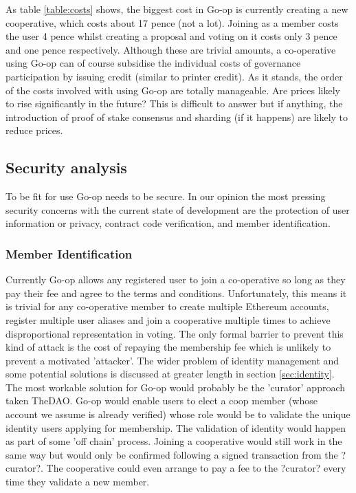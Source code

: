 As table \ref{table:costs} shows, the biggest cost in Go-op is currently creating a new cooperative, which costs about 17 pence (not a lot). Joining as a member costs the user 4 pence whilst creating a proposal and voting on it costs only 3 pence and one pence respectively. Although these are trivial amounts, a co-operative using Go-op can of course subsidise the individual costs of governance participation by issuing credit (similar to printer credit). As it stands, the order of the costs involved with using Go-op are totally manageable. Are prices likely to rise significantly in the future? This is difficult to answer but if anything, the introduction of proof of stake consensus and sharding (if it happens) are likely to reduce prices.\\

\subsection{Security analysis}
To be fit for use Go-op needs to be secure. In our opinion the most pressing security concerns with the current state of development are the protection of user information or privacy, contract code verification, and member identification.\\

\subsubsection{Member Identification}
Currently Go-op allows any registered user to join a co-operative so long as they pay their fee and agree to the terms and conditions. Unfortunately, this means it is trivial for any co-operative member to create multiple Ethereum accounts, register multiple user aliases and join a cooperative multiple times to achieve disproportional representation in voting. The only formal barrier to prevent this kind of attack is the cost of repaying the membership fee which is unlikely to prevent a motivated 'attacker'. The wider problem of identity management and some potential solutions is discussed at greater length in section \ref{sec:identity}. The most workable solution for Go-op would probably be the 'curator' approach taken TheDAO. Go-op would enable users to elect a coop member (whose account we assume is already verified) whose role would be to validate the unique identity users applying for membership. The validation of identity would happen as part of some 'off chain' process. Joining a cooperative would still work in the same way but would only be confirmed following a signed transaction from the ?curator?. The cooperative could even arrange to pay a fee to the ?curator? every time they validate a new member.\\


